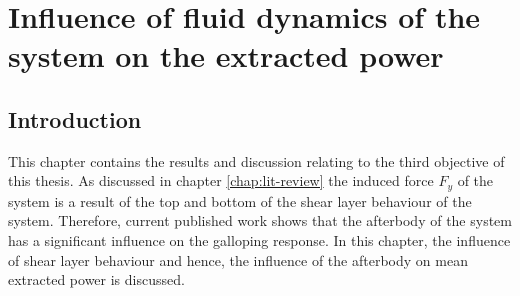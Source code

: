 \chapter{Influence of fluid dynamics of the system on the extracted power}

\section{Introduction}

This chapter contains the results and discussion relating to the third objective of this thesis. As discussed in chapter \ref{chap:lit-review} the induced force $F_y$ of the system is a result of the top and bottom of the shear layer behaviour of the system. Therefore, current published work shows that the afterbody of the system has a significant influence on the galloping response. In this chapter, the influence of shear layer behaviour and hence, the influence of the afterbody on mean extracted power is discussed.




  









